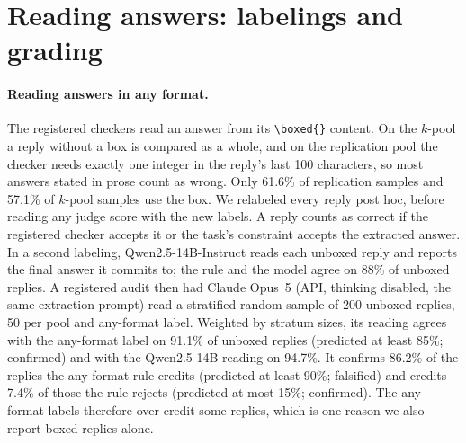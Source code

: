 \FloatBarrier
\section{Reading answers: labelings and grading}
\label{app:grid}

\paragraph{Reading answers in any format.}
The registered checkers read an answer from its \texttt{\textbackslash boxed\{\}} content. On the $k$-pool a reply without a box is compared as a whole, and on the replication pool the checker needs exactly one integer in the reply's last 100 characters, so most answers stated in prose count as wrong. Only 61.6\% of replication samples and 57.1\% of $k$-pool samples use the box.
We relabeled every reply post hoc, before reading any judge score with the new labels. A reply counts as correct if the registered checker accepts it or the task's constraint accepts the extracted answer. In a second labeling, Qwen2.5-14B-Instruct reads each unboxed reply and reports the final answer it commits to; the rule and the model agree on 88\% of unboxed replies. A registered audit then had Claude Opus~5 (API, thinking disabled, the same extraction prompt) read a stratified random sample of 200 unboxed replies, 50 per pool and any-format label. Weighted by stratum sizes, its reading agrees with the any-format label on 91.1\% of unboxed replies (predicted at least 85\%; confirmed) and with the Qwen2.5-14B reading on 94.7\%. It confirms 86.2\% of the replies the any-format rule credits (predicted at least 90\%; falsified) and credits 7.4\% of those the rule rejects (predicted at most 15\%; confirmed). The any-format labels therefore over-credit some replies, which is one reason we also report boxed replies alone.

